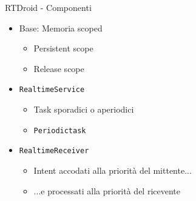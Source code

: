\begin{frame}{RTDroid - Componenti}
	\begin{itemize}
		\item Base: Memoria scoped
		\begin{itemize}
			\item Persistent scope
			\item Release scope
		\end{itemize}
		\item \texttt{RealtimeService}
		\begin{itemize}
			\item Task sporadici o aperiodici
			\item \texttt{Periodictask}
		\end{itemize}
		\item \texttt{RealtimeReceiver}
		\begin{itemize}
			\item Intent accodati alla priorità del mittente...
			\item ...e processati alla priorità del ricevente
		\end{itemize}
	\end{itemize}
\end{frame}
